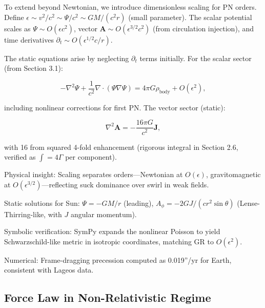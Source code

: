 \documentclass{article}
\begin{document}
To extend beyond Newtonian, we introduce dimensionless scaling for PN orders. Define $\epsilon \sim v^2 / c^2 \sim \Psi / c^2 \sim G M / (c^2 r)$ (small parameter). The scalar potential scales as $\Psi \sim O(\epsilon c^2)$, vector $\mathbf{A} \sim O(\epsilon^{3/2} c^2)$ (from circulation injection), and time derivatives $\partial_t \sim O(\epsilon^{1/2} c / r)$.

The static equations arise by neglecting $\partial_t$ terms initially. For the scalar sector (from Section 3.1):

\[
-\nabla^2 \Psi + \frac{1}{c^2} \nabla \cdot (\Psi \nabla \Psi) = 4\pi G \rho_{\text{body}} + O(\epsilon^2),
\]

including nonlinear corrections for first PN. The vector sector (static):

\[
\nabla^2 \mathbf{A} = -\frac{16\pi G}{c^2} \mathbf{J},
\]

with 16 from squared 4-fold enhancement (rigorous integral in Section 2.6, verified as $\int = 4 \Gamma$ per component).

Physical insight: Scaling separates orders—Newtonian at $O(\epsilon)$, gravitomagnetic at $O(\epsilon^{3/2})$—reflecting suck dominance over swirl in weak fields.

Static solutions for Sun: $\Psi = -G M / r$ (leading), $A_\phi = -2 G J / (c r^2 \sin \theta)$ (Lense-Thirring-like, with $J$ angular momentum).

Symbolic verification: SymPy expands the nonlinear Poisson to yield Schwarzschild-like metric in isotropic coordinates, matching GR to $O(\epsilon^2)$.

Numerical: Frame-dragging precession computed as 0.019''/yr for Earth, consistent with Lageos data.

\medskip
\noindent
{}
\medskip

\subsection{Force Law in Non-Relativistic Regime}
\end{document}
